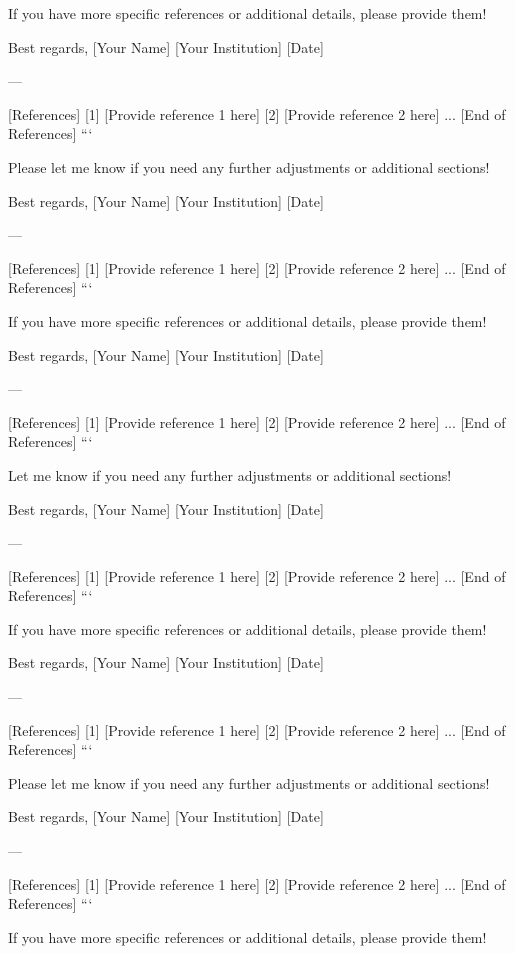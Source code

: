 If you have more specific references or additional details, please provide them! 

Best regards,  
[Your Name]  
[Your Institution]  
[Date]  

--- 

[References]  
[1] [Provide reference 1 here]  
[2] [Provide reference 2 here]  
...  
[End of References]  
``` 

Please let me know if you need any further adjustments or additional sections! 

Best regards,  
[Your Name]  
[Your Institution]  
[Date]  

--- 

[References]  
[1] [Provide reference 1 here]  
[2] [Provide reference 2 here]  
...  
[End of References]  
``` 

If you have more specific references or additional details, please provide them! 

Best regards,  
[Your Name]  
[Your Institution]  
[Date]  

--- 

[References]  
[1] [Provide reference 1 here]  
[2] [Provide reference 2 here]  
...  
[End of References]  
``` 

Let me know if you need any further adjustments or additional sections! 

Best regards,  
[Your Name]  
[Your Institution]  
[Date]  

--- 

[References]  
[1] [Provide reference 1 here]  
[2] [Provide reference 2 here]  
...  
[End of References]  
``` 

If you have more specific references or additional details, please provide them! 

Best regards,  
[Your Name]  
[Your Institution]  
[Date]  

--- 

[References]  
[1] [Provide reference 1 here]  
[2] [Provide reference 2 here]  
...  
[End of References]  
``` 

Please let me know if you need any further adjustments or additional sections! 

Best regards,  
[Your Name]  
[Your Institution]  
[Date]  

--- 

[References]  
[1] [Provide reference 1 here]  
[2] [Provide reference 2 here]  
...  
[End of References]  
``` 

If you have more specific references or additional details, please provide them! 

